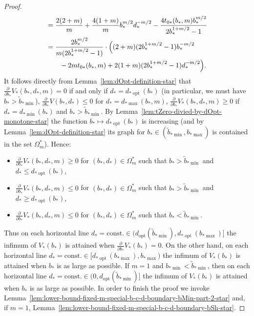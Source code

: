 \documentclass[a4paper]{amsart} %
\theoremstyle{definition}
\theoremstyle{remark}
\numberwithin{equation}{section}
\newcommand*{\bStar}{b_*}
\newcommand*{\dStar}{d_*}
\newcommand*{\tZeroStar}{t_{0*}}
\newcommand*{\specialbdStar}[1]{\Omega_{#1}^*}
\newcommand*{\XXXspecialbdDenominator}{V}
\newcommand*{\XXXspecialbdDenominatorStar}{V_*}
\newcommand*{\dOpt}{d_{\mathrm{opt}}}
\newcommand*{\bMinStar}{b_{*\!\min}}
\newcommand*{\bMaxStar}{b_{*\!\max}}
\newcommand*{\dMinStar}{d_{*\!\min}}
\newcommand*{\dMaxStar}{d_{*\!\max}}
\newcommand*{\dOptStar}{d_{*\!\operatorname{opt}}}
\newcommand*{\bMinTildeStar}{\widetilde{b}_{*\!\min}}
\begin{document}
\begin{proof}
\begin{align*}
	&=  \frac{2(2+m)}{m}
	+ \frac{4(1+m)}{m}\bStar^{m/2}  \dStar^{-m/2} 
	-\frac{4\tZeroStar(\bStar,m) \bStar^{m/2}}{2 \bStar^{1+m/2} -1 }\\
	&=   \frac{2\bStar^{m/2} 
	}{m(2 \bStar^{1+m/2} -1)}
	\cdot
	\Bigl( 
	(2+m)(2\bStar^{1+m/2} -1)\bStar^{-m/2} \\
	&\qquad -2m \tZeroStar(\bStar,m)
	+ 2(1+m)(2 \bStar^{1+m/2} -1)\dStar^{-m/2}	\Bigr).
	\end{align*}
	It follows directly from Lemma~\ref{lem:dOpt-definition-star} that 
	$\frac{\partial }{\partial  \bStar} \XXXspecialbdDenominatorStar(\bStar,\dStar,m) = 0$
	if and only if $\dStar = \dOptStar(\bStar)$ (in particular, we must have $\bStar > \bMinTildeStar$),
	$ \frac{\partial }{\partial \bStar} \XXXspecialbdDenominator(\bStar,\dStar) \leq 0$ for $\dStar = \dMaxStar(\bStar,m)$,
	$ \frac{\partial }{\partial \bStar} \XXXspecialbdDenominatorStar(\bStar,\dStar, m) \geq 0$
	if $\dStar = \dMinStar(\bStar)$ and $\bStar >\bMinTildeStar$.
	By Lemma~\ref{lem:tZero-divied-by-dOpt-monotone-star} 
	the function
	$\bStar\mapsto \dOptStar(\bStar)$ is increasing 
	(and by Lemma~\ref{lem:dOpt-definition-star} its graph for $\bStar\in(\bMinTildeStar, \bMaxStar)$ is contained in the set $\specialbdStar{m}$).
	Hence:
	\begin{itemize}
		\item $ \frac{\partial }{\partial \bStar} \XXXspecialbdDenominatorStar(\bStar,\dStar, m) \geq 0$ for $(\bStar,\dStar)\in\specialbdStar{m}$ 
		such that $\bStar > \bMinTildeStar$ and $\dStar \leq \dOptStar(\bStar)$,
		\item $ \frac{\partial }{\partial \bStar} \XXXspecialbdDenominatorStar(\bStar,\dStar,m) \leq 0$ for $(\bStar,\dStar)\in\specialbdStar{m}$  such that $\bStar>\bMinTildeStar$ and $\dStar \geq \dOptStar(\bStar)$,
		\item $ \frac{\partial }{\partial \bStar} \XXXspecialbdDenominatorStar(\bStar,\dStar,m) \leq 0$ for $(\bStar,\dStar)\in\specialbdStar{m}$  such that $\bStar <\bMinTildeStar$.
	\end{itemize}
	Thus on each horizontal line $\dStar= \text{const.} \in (\dOpt(\bMinTildeStar),\dOptStar(\bMaxStar)]$
	the infimum of $\XXXspecialbdDenominatorStar(\bStar)$ is attained when
	$\frac{\partial }{\partial  \bStar} \XXXspecialbdDenominatorStar(\bStar) = 0$.
	On the other hand,
	on each horizontal line $\dStar= \text{const.} \in [\dOptStar(\bMaxStar), \bMaxStar )$
	the infimum of $\XXXspecialbdDenominatorStar(\bStar)$ is attained when $\bStar$ is as large as possible.
	If $m=1$ and $\bMinStar < \bMinTildeStar$, then 
	on each horizontal line $\dStar= \text{const.} \in (0, \dOpt(\bMinTildeStar)]$
	the infimum of $\XXXspecialbdDenominatorStar(\bStar)$ is attained when
	$\bStar$ is as large as possible.
	In order to finish the proof we invoke Lemma~\ref{lem:lower-bound-fixed-m-special-b-c-d-boundary-bMin-part-2-star}
	and, if $m=1$, Lemma~\ref{lem:lower-bound-fixed-m-special-b-c-d-boundary-bSh-star}. 
\end{proof}
\end{document}
